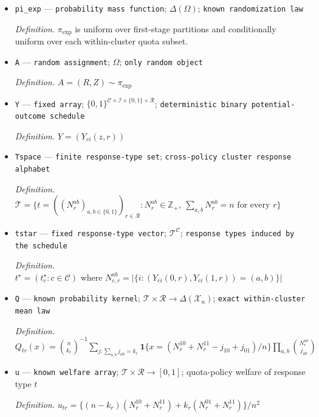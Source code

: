 \documentclass{article}
\begin{document}
\begin{itemize}
  \par\smallskip\noindent\emph{Definition.} \(\Omega=\{(R,Z):|\{c:R_c=r\}|=m_r,\ \sum_{i\in\mathcal I}Z_{ci}=k_{R_c}\text{ for every }c\in\mathcal C\}\)
  \item \texttt{pi\_\allowbreak{}exp} --- \texttt{probability mass function}; \(\Delta(\Omega)\); \texttt{known randomization law}
  \par\smallskip\noindent\emph{Definition.} \(\pi_{\exp}\) is uniform over first-stage partitions and conditionally uniform over each within-cluster quota subset.
  \item \texttt{A} --- \texttt{random assignment}; \(\Omega\); \texttt{only random object}
  \par\smallskip\noindent\emph{Definition.} \(A=(R,Z)\sim\pi_{\exp}\)
  \item \texttt{Y} --- \texttt{fixed array}; \(\{0,1\}^{\mathcal C\times\mathcal I\times\{0,1\}\times\mathcal R}\); \texttt{deterministic binary potential-\allowbreak{}outcome schedule}
  \par\smallskip\noindent\emph{Definition.} \(Y=(Y_{ci}(z,r))\)
  \item \texttt{Tspace} --- \texttt{finite response-\allowbreak{}type set}; \texttt{cross-\allowbreak{}policy cluster response alphabet}
  \par\smallskip\noindent\emph{Definition.} \(\mathcal T=\{t=((N_{r}^{ab})_{a,b\in\{0,1\}})_{r\in\mathcal R}:N_r^{ab}\in\mathbb Z_+,\ \sum_{a,b}N_r^{ab}=n\text{ for every }r\}\)
  \item \texttt{tstar} --- \texttt{fixed response-\allowbreak{}type vector}; \(\mathcal T^{\mathcal C}\); \texttt{response types induced by the schedule}
  \par\smallskip\noindent\emph{Definition.} \(t^\star=(t_c^\star:c\in\mathcal C)\text{ where }N_{c,r}^{ab}=|\{i:(Y_{ci}(0,r),Y_{ci}(1,r))=(a,b)\}|\)
  \item \texttt{Q} --- \texttt{known probability kernel}; \(\mathcal T\times\mathcal R\to\Delta(\mathcal X_n)\); \texttt{exact within-\allowbreak{}cluster mean law}
  \par\smallskip\noindent\emph{Definition.} \(Q_{tr}(x)=\binom{n}{k_r}^{-1}\sum_{j:\sum_{a,b}j_{ab}=k_r}\mathbf 1\{x=(N_r^{10}+N_r^{11}-j_{10}+j_{01})/n\}\prod_{a,b}\binom{N_r^{ab}}{j_{ab}}\)
  \item \texttt{u} --- \texttt{known welfare array}; \(\mathcal T\times\mathcal R\to[0,1]\); quota-policy welfare of response type \(t\)
  \par\smallskip\noindent\emph{Definition.} \(u_{tr}=\{(n-k_r)(N_r^{10}+N_r^{11})+k_r(N_r^{01}+N_r^{11})\}/n^2\)

\end{itemize}
\end{document}
